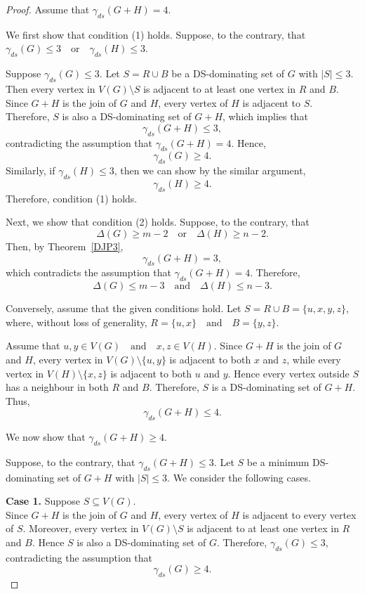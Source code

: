 \documentclass{article}
\begin{document}
\begin{proof}
Assume that $\gamma_{ds}(G+H)=4$.

We first show that condition (1) holds. Suppose, to the contrary, that $
\gamma_{ds}(G)\le3 \quad \text{or} \quad \gamma_{ds}(H)\le3.$

Suppose $\gamma_{ds}(G)\le3$. Let $S=R\cup B$ be a DS-dominating set  of $G$ with
$|S|\le3$. Then every vertex in $V(G)\setminus S$ is adjacent to at least
one vertex in $R$ and  $B$. Since $G+H$ is the join of
$G$ and $H$, every vertex of $H$ is adjacent to  $S$.
Therefore, $S$ is also a DS-dominating set of $G+H$, which implies that
\[
\gamma_{ds}(G+H)\le3,
\]
contradicting the assumption that $\gamma_{ds}(G+H)=4$. Hence,
\[
\gamma_{ds}(G)\ge4.
\]
Similarly, if $\gamma_{ds}(H)\le3$, then we can show by the similar argument,
\[
\gamma_{ds}(H)\ge4.
\]
Therefore, condition (1) holds.

Next, we show that condition (2) holds. Suppose, to the contrary, that
\[
\Delta(G)\ge m-2 \quad \text{or} \quad \Delta(H)\ge n-2.
\]
Then, by Theorem~\ref{DJP3},
\[
\gamma_{ds}(G+H)=3,
\]
which contradicts the assumption that $\gamma_{ds}(G+H)=4$. Therefore,
\[
\Delta(G)\le m-3
\quad \text{and} \quad
\Delta(H)\le n-3.
\]

Conversely, assume that the given conditions hold. Let $S=R\cup B=\{u,x,y,z\}$, 
where, without loss of generality, $R=\{u,x\}
\quad \text{and} \quad
B=\{y,z\}$.

Assume that $u,y\in V(G)
\quad \text{and} \quad x,z\in V(H)$.
Since $G+H$ is the join of $G$ and $H$, every vertex in
$V(G)\setminus\{u,y\}$ is adjacent to both $x$ and $z$, while every vertex in
$V(H)\setminus\{x,z\}$ is adjacent to both $u$ and $y$. Hence every vertex outside $S$ has a neighbour in both $R$ and $B$. Therefore, $S$ is a DS-dominating set of
$G+H$. Thus,
\[
\gamma_{ds}(G+H)\le4.
\]

We now show that $
\gamma_{ds}(G+H)\ge4$.

Suppose, to the contrary, that $
\gamma_{ds}(G+H)\le3$.
Let $S$ be a minimum DS-dominating set  of $G+H$ with $|S|\le3$. We consider the following
cases.

\textbf{Case 1.} Suppose $S\subseteq V(G)$.\\
Since $G+H$ is the join of $G$ and $H$, every vertex of $H$ is adjacent to
every vertex of $S$. Moreover, every vertex in $V(G)\setminus S$ is adjacent
to at least one vertex in $R$ and  $B$. Hence $S$ is
also a DS-dominating set of $G$. Therefore,
$
\gamma_{ds}(G)\le3$,
contradicting the assumption that
\[
\gamma_{ds}(G)\ge4.
\]


\end{proof}
\end{document}
